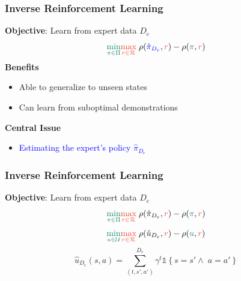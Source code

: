 \documentclass{beamer}
\begin{document}
\begin{frame}
	\frametitle{Inverse Reinforcement Learning}
	\textbf{Objective}: Learn from expert data $D_e$
	\[ 
		\textcolor{PineGreen}{\min_{\pi \in \Pi}} \textcolor{RedOrange}{\max_{r \in \mathcal{R}}} \; \rho(\textcolor{blue}{\hat{\pi}_{D_e}}, \textcolor{RedOrange}{r}) - \rho(\textcolor{PineGreen}{\pi}, \textcolor{RedOrange}{r})
	\]
	\vfill
	\textbf{Benefits}
	\begin{itemize}
		\item Able to generalize to unseen states
		\item Can learn from suboptimal demonstrations
	\end{itemize}
	\vfill
	\textbf{Central Issue}
	\begin{itemize}
		\item \textcolor{blue}{Estimating the expert's policy $\hat{\pi}_{D_e}$}
	\end{itemize}
\end{frame}

\begin{frame}
	\frametitle{Inverse Reinforcement Learning}
	\textbf{Objective}: Learn from expert data $D_e$
	\begin{equation}
		\textcolor{PineGreen}{\min_{\pi \in \Pi}} \textcolor{RedOrange}{\max_{r \in \mathcal{R}}}\; \rho(\hat{\pi}_{D_e}, \textcolor{RedOrange}{r}) - \rho(\textcolor{PineGreen}{\pi}, \textcolor{RedOrange}{r})
	\end{equation}
	\center{\textcolor{red}{Not convex!}}
	\vfill
	\begin{equation}
		\textcolor{PineGreen}{\min_{u \in \mathcal{U}}} \textcolor{RedOrange}{\max_{r \in \mathcal{R}}}\; \rho(\hat{u}_{D_e}, \textcolor{RedOrange}{r}) - \rho(\textcolor{PineGreen}{u}, \textcolor{RedOrange}{r})
	\end{equation}
	\[
		\hat{u}_{D_e}(s,a) = \sum_{(t, s',a')}^{D_e} \gamma^t \mathds{1} \left\{s=s' \wedge\; a=a'\right\}
	\]
\end{frame}
\end{document}
